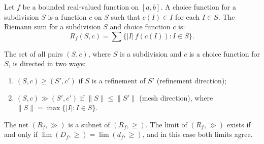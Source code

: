 Let $f$ be a bounded real-valued function on $[a,b]$. A choice function for a subdivision $S$ is a function $c$ on $S$ such that $c(I) \in I$ for each $I \in S$. The Riemann sum for a subdivision $S$ and choice function $c$ is:
$$R_f(S, c) = \sum\{|I| \, f(c(I)) : I \in S\}.$$

The set of all pairs $(S, c)$, where $S$ is a subdivision and $c$ is a choice function for $S$, is directed in two ways:
\begin{enumerate}
\item[(i)] $(S, c) \geq (S', c')$ if $S$ is a refinement of $S'$ (refinement direction);
\item[(ii)] $(S, c) \gg (S', c')$ if $\|S\| \leq \|S'\|$ (mesh direction), where $\|S\| = \max\{|I| : I \in S\}$.
\end{enumerate}

The net $(R_f, \gg)$ is a subnet of $(R_f, \geq)$. The limit of $(R_f, \gg)$ exists if and only if $\lim (D_f, \geq) = \lim (d_f, \geq)$, and in this case both limits agree.
